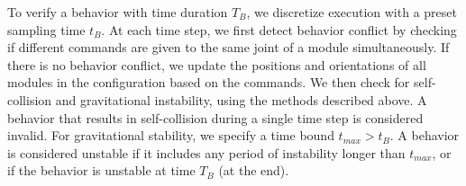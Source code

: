 \documentclass[graybox]{svmult}
\begin{document}
% 

To verify a behavior with time duration  $T_B$, we discretize execution with a preset sampling time $t_B$. At each time step, we first detect behavior conflict by checking if different commands are given to the same joint of a module simultaneously. If there is no behavior conflict, we update the positions and orientations of all modules in the configuration based on the commands. We then check for self-collision and gravitational instability, using the methods described above.  
A behavior that results in self-collision during a single time step is considered
invalid. For gravitational stability, we specify a time bound
\(t_{max} > t_B\). A behavior is considered unstable if it
includes any period of instability longer than \(t_{max}\), or if the behavior is unstable at time \(T_B\) (at the end).
\end{document}
